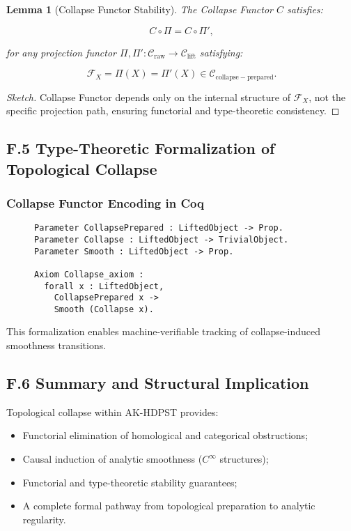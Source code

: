 \documentclass[11pt]{article}
\newtheorem{lemma}[theorem]{Lemma}
\begin{document}
\begin{lemma}[Collapse Functor Stability]
The Collapse Functor \( C \) satisfies:

\[
C \circ \Pi = C \circ \Pi',
\]

for any projection functor \( \Pi, \Pi' : \mathcal{C}_{\mathrm{raw}} \to \mathcal{C}_{\mathrm{lift}} \) satisfying:

\[
\mathcal{F}_X = \Pi(X) = \Pi'(X) \in \mathcal{C}_{\mathrm{collapse-prepared}}.
\]

\end{lemma}

\begin{proof}[Sketch]
Collapse Functor depends only on the internal structure of \( \mathcal{F}_X \), not the specific projection path, ensuring functorial and type-theoretic consistency.
\end{proof}

\subsection*{F.5 Type-Theoretic Formalization of Topological Collapse}

\subsubsection*{Collapse Functor Encoding in Coq}

\begin{figure}[h]
\centering
\begin{lstlisting}[language=Coq, caption=Topological Collapse and Smoothness Encoding]
Parameter CollapsePrepared : LiftedObject -> Prop.
Parameter Collapse : LiftedObject -> TrivialObject.
Parameter Smooth : LiftedObject -> Prop.

Axiom Collapse_axiom :
  forall x : LiftedObject,
    CollapsePrepared x ->
    Smooth (Collapse x).
\end{lstlisting}
\end{figure}

This formalization enables machine-verifiable tracking of collapse-induced smoothness transitions.

\subsection*{F.6 Summary and Structural Implication}

Topological collapse within AK-HDPST provides:

\begin{itemize}
    \item Functorial elimination of homological and categorical obstructions;
    \item Causal induction of analytic smoothness (\( C^\infty \) structures);
    \item Functorial and type-theoretic stability guarantees;
    \item A complete formal pathway from topological preparation to analytic regularity.
\end{itemize}
\end{document}
